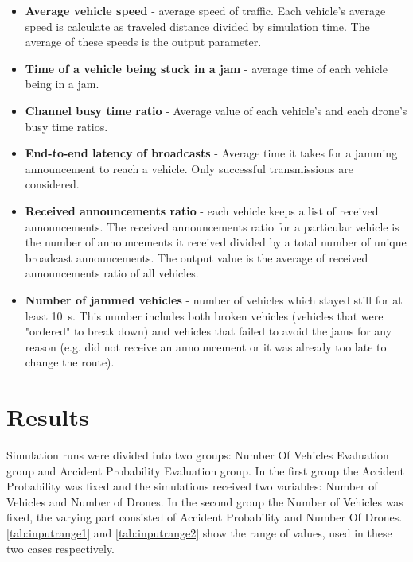 \documentclass[]{nsm-thesis}
\begin{document}
\begin{itemize}

	\item \textbf{Average vehicle speed} - average speed of traffic. Each vehicle's average speed is calculate as traveled distance divided by simulation time. The average of these speeds is the output parameter.
	
	\item \textbf{Time of a vehicle being stuck in a jam} - average time of each vehicle being in a jam.
	
	\item \textbf{Channel busy time ratio} - Average value of each vehicle's and each drone's busy time ratios.

	\item \textbf{End-to-end latency of broadcasts} - Average time it takes for a jamming announcement to reach a vehicle. Only successful transmissions are considered.

	\item \textbf{Received announcements ratio} - each vehicle keeps a list of received announcements. The received announcements ratio for a particular vehicle is the number of announcements it received divided by a total number of unique broadcast announcements. The output value is the average of received announcements ratio of all vehicles.

	\item \textbf{Number of jammed vehicles} - number of vehicles which stayed still for at least \SI{10}{\second}. This number includes both broken vehicles (vehicles that were "ordered" to break down) and vehicles that failed to avoid the jams for any reason (e.g. did not receive an announcement or it was already too late to change the route).

\end{itemize}

\section{Results}

Simulation runs were divided into two groups: Number Of Vehicles Evaluation group and Accident Probability Evaluation group. In the first group the Accident Probability was fixed and the simulations received two variables: Number of Vehicles and Number of Drones. In the second group the Number of Vehicles was fixed, the varying part consisted of Accident Probability and Number Of Drones. \cref{tab:inputrange1} and \cref{tab:inputrange2} show the range of values, used in these two cases respectively.
\end{document}
